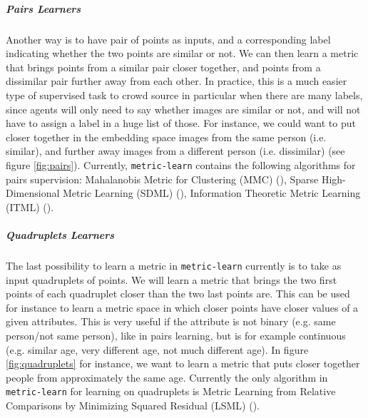 \documentclass[twoside,11pt]{article}
\begin{document}
\subparagraph{Pairs Learners} 
Another way is to have pair of points as inputs, and a corresponding label indicating whether the two points are similar or not. We can then learn a metric that brings points from a similar pair closer together, and points from a dissimilar pair further away from each other. In practice, this is a much easier type of supervised task to crowd source in particular when there are many labels, since agents will only need to say whether images are similar or not, and will not have to assign a label in a huge list of those. For instance, we could want to put closer together in the embedding space images from the same person (i.e. similar), and further away images from a different person (i.e. dissimilar) (see figure \ref{fig:pairs}). Currently, \texttt{metric-learn} contains the following algorithms for pairs supervision: Mahalanobis Metric for Clustering (MMC) (\cite{Xiang08}), Sparse High-Dimensional Metric Learning (SDML) (\cite{Qi09}), Information Theoretic Metric Learning (ITML) (\cite{Davis07}).
    

    

    
\subparagraph{Quadruplets Learners}
The last possibility to learn a metric in \texttt{metric-learn} currently is to take as input quadruplets of points. We will learn a metric that brings the two first points of each quadruplet closer than the two last points are. This can be used for instance to learn a metric space in which closer points have closer values of a given attributes. This is very useful if the attribute is not binary (e.g. same person/not same person), like in pairs learning, but is for example continuous (e.g. similar age, very different age, not much different age). In figure \ref{fig:quadruplets} for instance, we want to learn a metric that puts closer together people from approximately the same age. Currently the only algorithm in \texttt{metric-learn} for learning on quadruplets is Metric Learning from Relative Comparisons by Minimizing Squared Residual (LSML) (\cite{Liu12}).
\end{document}
